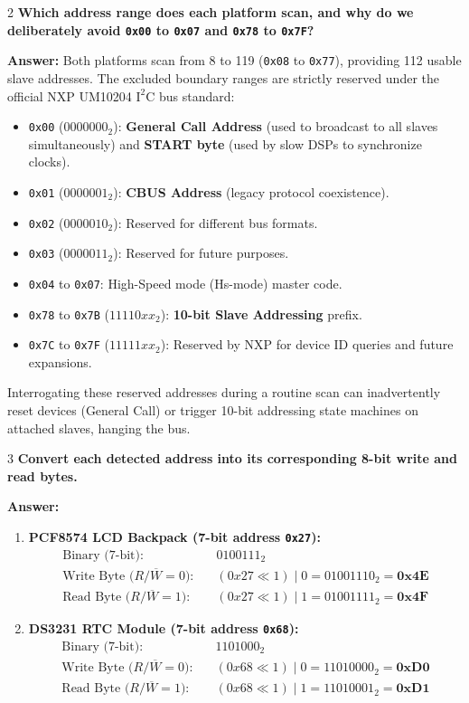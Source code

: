 \documentclass[11pt,a4paper]{article}
\begin{document}
\begin{questionbox}{2}
\textbf{Which address range does each platform scan, and why do we deliberately avoid \texttt{0x00} to \texttt{0x07} and \texttt{0x78} to \texttt{0x7F}?}
\end{questionbox}
\textbf{Answer:} Both platforms scan from 8 to 119 (\texttt{0x08} to \texttt{0x77}), providing 112 usable slave addresses. The excluded boundary ranges are strictly reserved under the official NXP UM10204 $\text{I}^2\text{C}$ bus standard:

\begin{itemize}
    \item \texttt{0x00} ($0000000_2$): \textbf{General Call Address} (used to broadcast to all slaves simultaneously) and \textbf{START byte} (used by slow DSPs to synchronize clocks).
    \item \texttt{0x01} ($0000001_2$): \textbf{CBUS Address} (legacy protocol coexistence).
    \item \texttt{0x02} ($0000010_2$): Reserved for different bus formats.
    \item \texttt{0x03} ($0000011_2$): Reserved for future purposes.
    \item \texttt{0x04} to \texttt{0x07}: High-Speed mode (Hs-mode) master code.
    \item \texttt{0x78} to \texttt{0x7B} ($11110xx_2$): \textbf{10-bit Slave Addressing} prefix.
    \item \texttt{0x7C} to \texttt{0x7F} ($11111xx_2$): Reserved by NXP for device ID queries and future expansions.
\end{itemize}
Interrogating these reserved addresses during a routine scan can inadvertently reset devices (General Call) or trigger 10-bit addressing state machines on attached slaves, hanging the bus.

\begin{questionbox}{3}
\textbf{Convert each detected address into its corresponding 8-bit write and read bytes.}
\end{questionbox}
\textbf{Answer:}
\begin{enumerate}
    \item \textbf{PCF8574 LCD Backpack (7-bit address \texttt{0x27}):}
    \begin{align*}
    \text{Binary (7-bit):} \quad & 0100111_2 \\
    \text{Write Byte ($R/\overline{W}=0$):} \quad & (0x27 \ll 1) \;|\; 0 = 01001110_2 = \mathbf{0x4E} \\
    \text{Read Byte ($R/\overline{W}=1$):} \quad & (0x27 \ll 1) \;|\; 1 = 01001111_2 = \mathbf{0x4F}
    \end{align*}
    \item \textbf{DS3231 RTC Module (7-bit address \texttt{0x68}):}
    \begin{align*}
    \text{Binary (7-bit):} \quad & 1101000_2 \\
    \text{Write Byte ($R/\overline{W}=0$):} \quad & (0x68 \ll 1) \;|\; 0 = 11010000_2 = \mathbf{0xD0} \\
    \text{Read Byte ($R/\overline{W}=1$):} \quad & (0x68 \ll 1) \;|\; 1 = 11010001_2 = \mathbf{0xD1}
    \end{align*}
\end{enumerate}
\end{document}
